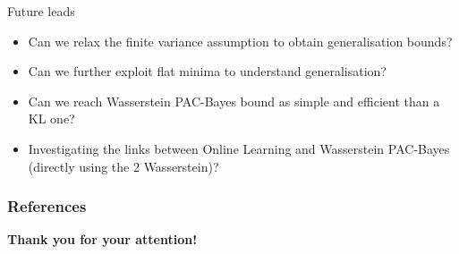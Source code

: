 \documentclass{presentation}
\begin{document}
\begin{xframe}{Future leads}
    \vspace{0.5cm}
    \begin{redblock}{}
    \end{redblock}
    \vspace{0.5cm}
    \begin{itemize}
        \item Can we relax the finite variance assumption to obtain generalisation bounds?
        \item Can we further exploit flat minima to understand generalisation?
        \item Can we reach Wasserstein PAC-Bayes bound as simple and efficient than a KL one? 
        \item Investigating the links between Online Learning and Wasserstein PAC-Bayes (directly using the 2 Wasserstein)?
    \end{itemize}

\end{xframe}

\begin{xframe}{}
    \vspace{4cm}



\end{xframe}










\appendix

\begin{frame}
  \frametitle{References}
  \printbibliography[title={References}]
 \end{frame}

\begin{xtitle}

\vspace{2.0cm}
{\bf Thank you for your attention!}\\

\end{xtitle}

 
\end{document}
